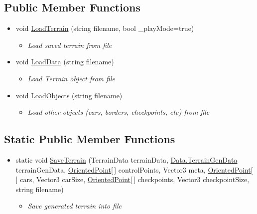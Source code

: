 \subsection*{Public Member Functions}
\begin{itemize}
\item[]  
void \mbox{\hyperlink{classRacingGameBot_1_1Terrains_1_1TerrainLoader_a7e82145f406430cf516265434a43d98a}{LoadTerrain}} (string filename, bool \_playMode=true)
\begin{itemize}\small\item[] \em Load saved terrain from file \end{itemize}\item[]  
void \mbox{\hyperlink{classRacingGameBot_1_1Terrains_1_1TerrainLoader_ad9e6dc6405f203a126eb3fe520a94834}{LoadData}} (string filename)
\begin{itemize}\small\item[] \em Load Terrain object from file \end{itemize}\item[]  
void \mbox{\hyperlink{classRacingGameBot_1_1Terrains_1_1TerrainLoader_a47767935d84faf745cc992b00cc40f11}{LoadObjects}} (string filename)
\begin{itemize}\small\item[] \em Load other objects (cars, borders, checkpoints, etc) from file \end{itemize}\end{itemize}
\subsection*{Static Public Member Functions}
\begin{itemize}
\item[]  
static void \mbox{\hyperlink{classRacingGameBot_1_1Terrains_1_1TerrainLoader_ad0789e00030abf3ec13cc8781c3fe8a2}{SaveTerrain}} (TerrainData terrainData, \mbox{\hyperlink{classRacingGameBot_1_1Data_1_1TerrainGenData}{Data.TerrainGenData}} terrainGenData, 
\mbox{\hyperlink{classRacingGameBot_1_1Terrains_1_1OrientedPoint}{OrientedPoint}}\mbox{[}$\,$\mbox{]} controlPoints, Vector3 meta, \mbox{\hyperlink{classRacingGameBot_1_1Terrains_1_1OrientedPoint}{OrientedPoint}}\mbox{[}$\,$\mbox{]} cars, Vector3 carSize, \mbox{\hyperlink{classRacingGameBot_1_1Terrains_1_1OrientedPoint}{OrientedPoint}}\mbox{[}$\,$\mbox{]} checkpoints, Vector3 checkpointSize, string filename)
\begin{itemize}\small\item[] \em Save generated terrain into file \end{itemize}\end{itemize}
